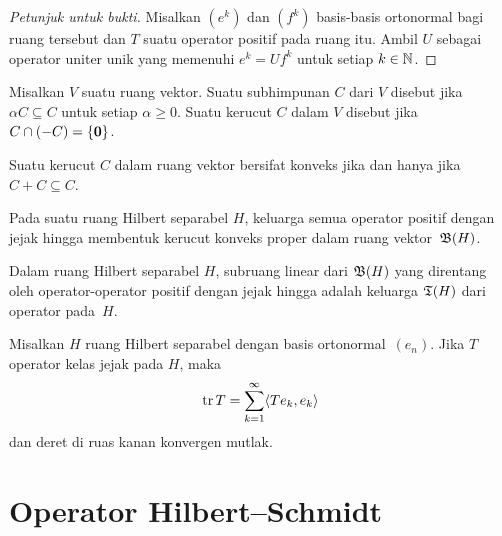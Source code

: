 \begin{proof}[\emph{Petunjuk untuk bukti}] Misalkan $(e^k)$ dan $(f^k)$ basis-basis ortonormal bagi ruang tersebut dan $T$ suatu operator positif
pada ruang itu. Ambil $U$ sebagai operator uniter unik yang memenuhi $e^k = Uf^k$ untuk setiap $k \in \mathbb{N}$.  \ns
\end{proof}

\begin{defn} Misalkan $V$ suatu ruang vektor. Suatu subhimpunan $C$ dari $V$ disebut
 jika $\alpha C \subseteq C$ untuk setiap $\alpha \ge 0$. Suatu kerucut $C$ dalam $V$ disebut
 jika $C \cap (-C) = \{\mathbf{0}\}$.
\end{defn}

 \begin{prop} Suatu kerucut $C$ dalam ruang vektor bersifat konveks jika dan hanya jika $C + C \subseteq C$.
\end{prop}

\begin{exam} Pada suatu ruang Hilbert separabel $H$, keluarga semua operator positif dengan jejak hingga membentuk kerucut konveks proper dalam ruang
vektor~$\mathfrak{B}(H)$.
\end{exam}

\begin{defn} Dalam ruang Hilbert separabel $H$, subruang linear dari $\mathfrak{B}(H)$ yang direntang oleh operator-operator positif dengan jejak hingga
adalah keluarga $\mathfrak{T}(H)$ dari operator
 pada~$H$.
\end{defn}

\begin{prop} Misalkan $H$ ruang Hilbert separabel dengan basis ortonormal~$(e_n)$. Jika $T$ operator kelas jejak pada $H$, maka
   \[ \operatorname{tr} T = \sum_{k=1}^\infty \langle Te_k,e_k \rangle \]
dan deret di ruas kanan konvergen mutlak.
\end{prop}
















\section{Operator Hilbert--Schmidt}

